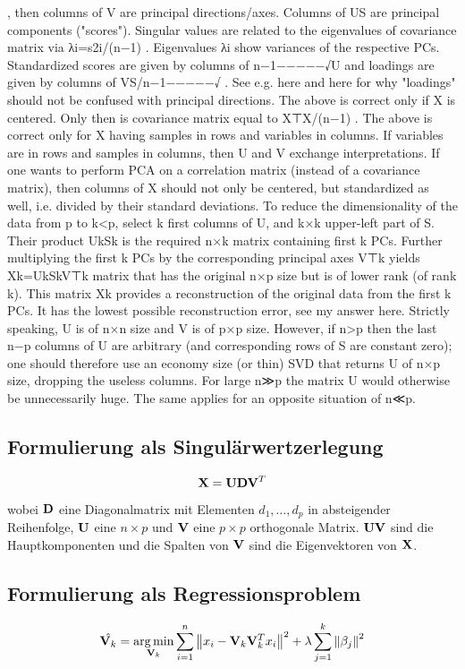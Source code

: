 , then columns of V
are principal directions/axes.
Columns of US
are principal components ("scores").
Singular values are related to the eigenvalues of covariance matrix via λi=s2i/(n−1)
. Eigenvalues λi
show variances of the respective PCs.
Standardized scores are given by columns of n−1−−−−−√U
and loadings are given by columns of VS/n−1−−−−−√
. See e.g. here and here for why "loadings" should not be confused with principal directions.
The above is correct only if X
is centered. Only then is covariance matrix equal to X⊤X/(n−1)
.
The above is correct only for X
having samples in rows and variables in columns. If variables are in rows and samples in columns, then U and V
exchange interpretations.
If one wants to perform PCA on a correlation matrix (instead of a covariance matrix), then columns of X
should not only be centered, but standardized as well, i.e. divided by their standard deviations.
To reduce the dimensionality of the data from p
to k<p, select k first columns of U, and k×k upper-left part of S. Their product UkSk is the required n×k matrix containing first k
PCs.
Further multiplying the first k
PCs by the corresponding principal axes V⊤k yields Xk=UkSkV⊤k matrix that has the original n×p size but is of lower rank (of rank k). This matrix Xk provides a reconstruction of the original data from the first k
PCs. It has the lowest possible reconstruction error, see my answer here.
Strictly speaking, U
is of n×n size and V is of p×p size. However, if n>p then the last n−p columns of U are arbitrary (and corresponding rows of S are constant zero); one should therefore use an economy size (or thin) SVD that returns U of n×p size, dropping the useless columns. For large n≫p the matrix U would otherwise be unnecessarily huge. The same applies for an opposite situation of n≪p.

\subsection{Formulierung als Singulärwertzerlegung}
$$ \mathbf{X} = \mathbf{U}\mathbf{D}\mathbf{V}^T $$
wobei $\mathbf{D}$ eine Diagonalmatrix mit Elementen $d_1,\ldots,d_p$ in absteigender Reihenfolge, $\mathbf{U}$ eine $n \times p$ und $\mathbf{V}$ eine $p \times p$ orthogonale Matrix.
$\mathbf{U}\mathbf{V}$ sind die Hauptkomponenten und die Spalten von $\mathbf{V}$ sind die Eigenvektoren von $\mathbf{X}$.

\subsection{Formulierung als Regressionsproblem}
$$\hat{\mathbf{V}_k} = \operatorname*{arg\,min}_{\mathbf{V}_k} \sum_{i=1}^{n} \left\lVert x_i - \mathbf{V}_k \mathbf{V}_k^Tx_i \right\rVert^2 + \lambda \sum_{j=1}^{k}\left\lVert \beta_j \right\rVert^2$$

